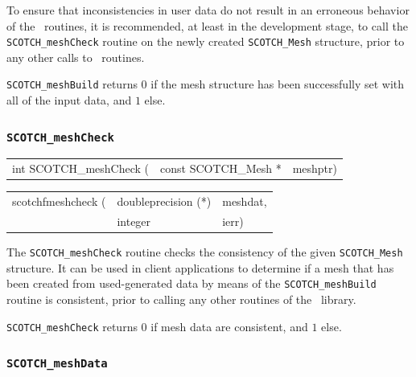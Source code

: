 \begin{itemize}
To ensure that inconsistencies in user data do not result in an
erroneous behavior of the \libscotch\ routines, it is recommended, at
least in the development stage, to call the {\tt SCOTCH\_\lbt mesh\lbt Check}
routine on the newly created {\tt SCOTCH\_\lbt Mesh} structure, prior
to any other calls to \libscotch\ routines.

\progret

{\tt SCOTCH\_meshBuild} returns $0$ if the mesh structure has been
successfully set with all of the input data, and $1$ else.
\end{itemize}

\subsubsection{{\tt SCOTCH\_meshCheck}}

\begin{itemize}
\progsyn

{\tt\begin{tabular}{l@{}ll}
int SCOTCH\_meshCheck ( & const SCOTCH\_Mesh * & meshptr)
\end{tabular}}

{\tt\begin{tabular}{l@{}ll}
scotchfmeshcheck ( & doubleprecision (*) & meshdat, \\
                   & integer             & ierr)
\end{tabular}}

\progdes

The {\tt SCOTCH\_meshCheck} routine checks the consistency of the
given {\tt SCOTCH\_\lbt Mesh} structure. It can be used in client
applications to determine if a mesh that has been created from
used-generated data by means of the {\tt SCOTCH\_\lbt mesh\lbt Build}
routine is consistent, prior to calling any other routines of the
\libscotch\ library.

\progret

{\tt SCOTCH\_meshCheck} returns $0$ if mesh data are consistent, and
$1$ else.

\end{itemize}

\subsubsection{{\tt SCOTCH\_meshData}}
\label{sec-lib-func-meshdata}

